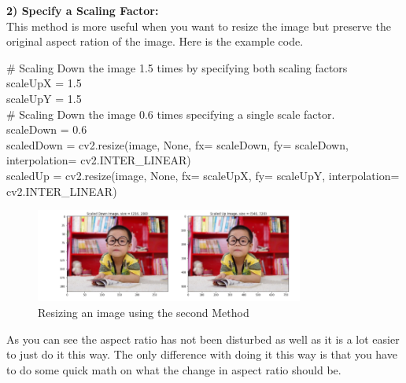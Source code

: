 \documentclass[fleqn]{article}
\begin{document}
    \newpage

    \textbf{2) Specify a Scaling Factor:}\\
    This method is more useful when you want to resize the image but preserve the original aspect ration of the image. Here is the example code.

    \begin{center}
      \# Scaling Down the image 1.5 times by specifying both scaling factors\\
      scaleUpX = 1.5\\
      scaleUpY = 1.5\\

      \# Scaling Down the image 0.6 times specifying a single scale factor.\\
      scaleDown = 0.6\\

      scaledDown = cv2.resize(image, None, fx= scaleDown, fy= scaleDown, interpolation= cv2.INTER\_LINEAR)\\

      scaledUp = cv2.resize(image, None, fx= scaleUpX, fy= scaleUpY, interpolation= cv2.INTER\_LINEAR)\\
    \end{center}

    \begin{figure}[h]
      \centering
      \includegraphics[width=250pt]{resizing2.png}
      \caption{Resizing an image using the second Method}
      \label{resizing2}
    \end{figure}

    As you can see the aspect ratio has not been disturbed as well as it is a lot easier to just do it this way. The only difference with doing it this way is that you have to do some quick math on what the change in aspect ratio should be.
\end{document}
